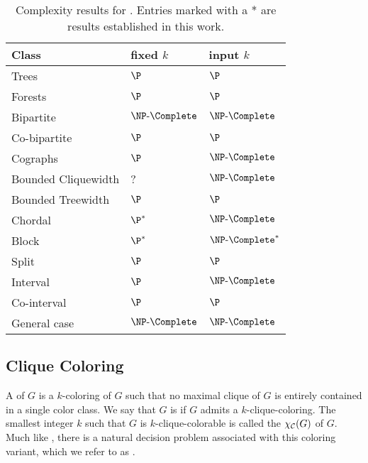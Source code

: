 \begin{table}[!htb]
    \centering
    \begin{tabular}{l|l|l}
       \hline
       \hline
       Class               &  fixed $k$         & input $k$             \\
       \hline
       Trees                &  $\P$             & $\P$                  \\
       Forests              &  $\P$             & $\P$                  \\
       Bipartite            &  $\NPc$           & $\NPc$                \\
       Co-bipartite         &  $\P$             & $\P$                  \\
       Cographs             &  $\P$             & $\NPc$                \\
       Bounded Cliquewidth  &  ?                & $\NPc$                \\
       Bounded Treewidth    &  $\P$             & $\P$                  \\
       Chordal              &  $\P^*$           & $\NPc$                \\
       Block                &  $\P^*$           & $\NPc^*$              \\
       Split                &  $\P$             & $\P$                  \\
       Interval             &  $\P$             & $\NPc$                \\
       Co-interval          &  $\P$             & $\P$                  \\
       General case         &  $\NPc$           & $\NPc$                \\
       \hline
       \hline
    \end{tabular}
    \caption{Complexity results for . Entries marked with a * are results established in this work.}
    \label{tab:equitable_complexity}
\end{table}

\subsection{Clique Coloring}
A  of $G$ is a $k$-coloring of $G$ such that no maximal clique of $G$ is entirely contained in a single color class.
We say that $G$ is  if $G$ admits a $k$-clique-coloring.
The smallest integer $k$ such that $G$ is $k$-clique-colorable is called the  $\chi_{\mathcal{C}}(G)$ of $G$.
Much like , there is a natural decision problem associated with this coloring variant, which we refer to as .


